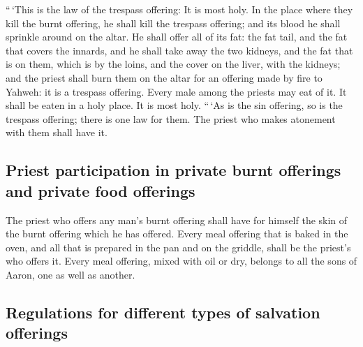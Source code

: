 \begin{paracol}{2}
\begin{otherlanguage}{english}
 ``\,`This is the law of the trespass offering: It is most
holy.  In the place where they kill the burnt offering, he
shall kill the trespass offering; and its blood he shall sprinkle around
on the altar.  He shall offer all of its fat: the fat
tail, and the fat that covers the innards,  and he shall
take away the two kidneys, and the fat that is on them, which is by the
loins, and the cover on the liver, with the kidneys;  and
the priest shall burn them on the altar for an offering made by fire to
Yahweh: it is a trespass offering.  Every male among the
priests may eat of it. It shall be eaten in a holy place. It is most
holy.  ``\,`As is the sin offering, so is the trespass
offering; there is one law for them. The priest who makes atonement with
them shall have it.

\hypertarget{priest-participation-in-private-burnt-offerings-and-private-food-offerings}{%
\subsection{Priest participation in private burnt offerings and private
food
offerings}\label{priest-participation-in-private-burnt-offerings-and-private-food-offerings}}

 The priest who offers any man's burnt offering shall have
for himself the skin of the burnt offering which he has offered.
 Every meal offering that is baked in the oven, and all
that is prepared in the pan and on the griddle, shall be the priest's
who offers it.  Every meal offering, mixed with oil or
dry, belongs to all the sons of Aaron, one as well as another.

\hypertarget{regulations-for-different-types-of-salvation-offerings}{%
\subsection{Regulations for different types of salvation
offerings}\label{regulations-for-different-types-of-salvation-offerings}}


\end{otherlanguage}
\end{paracol}

